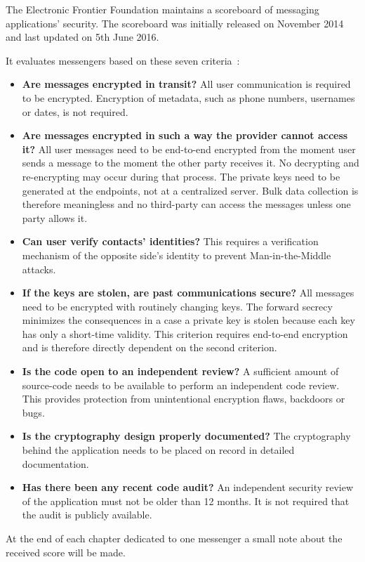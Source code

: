 \documentclass[thesis=M,english]{FITthesis}[2012/10/20]
\begin{document}
The Electronic Frontier Foundation maintains a scoreboard of messaging applications' security. The scoreboard was initially released on November 2014 and last updated on 5th June 2016.

It evaluates messengers based on these seven criteria~\cite{eff-score}:

\begin{itemize}
	\item \textbf{Are messages encrypted in transit?} All user communication is required to be encrypted. Encryption of metadata, such as phone numbers, usernames or dates, is not required. %
	\item \textbf{Are messages encrypted in such a way the provider cannot access it?} All user messages need to be end-to-end encrypted from the moment user sends a message to the moment the other party receives it. No decrypting and re-encrypting may occur during that process. The private keys need to be generated at the endpoints, not at a centralized server. Bulk data collection is therefore meaningless and no third-party can access the messages unless one party allows it.
	\item \textbf{Can user verify contacts' identities?} This requires a verification mechanism of the opposite side's identity to prevent Man-in-the-Middle attacks.
	\item \textbf{If the keys are stolen, are past communications secure?} All messages need to be encrypted with routinely changing keys. The forward secrecy minimizes the consequences in a case a private key is stolen because each key has only a short-time validity. This criterion requires end-to-end encryption and is therefore directly dependent on the second criterion.
	\item \textbf{Is the code open to an independent review?} A sufficient amount of source-code needs to be available to perform an independent code review. This provides protection from unintentional encryption flaws, backdoors or bugs.
	\item \textbf{Is the cryptography design properly documented?} The cryptography behind the application needs to be placed on record in detailed documentation.
	\item \textbf{Has there been any recent code audit?} An independent security review of the application must not be older than 12 months. It is not required that the audit is publicly available.
\end{itemize}

At the end of each chapter dedicated to one messenger a small note about the received score will be made.
\end{document}
